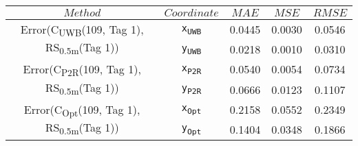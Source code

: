 \begin{table}[h]
\centering
\begin{tabular}{|c|c|c|c|c|}
\hline
$Method$ & $Coordinate$ & $MAE$ & $MSE$ & $RMSE$ \\
\hline
\multirow{2}{*}{{\footnotesize Error(C\textsubscript{UWB}(109, Tag 1), RS\textsubscript{0.5m}(Tag 1))}} & \texttt{x\textsubscript{UWB}} & 0.0445 & 0.0030 & 0.0546 \\
& \texttt{y\textsubscript{UWB}} & 0.0218 & 0.0010 & 0.0310 \\
\hline
\multirow{2}{*}{{\footnotesize Error(C\textsubscript{P2R}(109, Tag 1), RS\textsubscript{0.5m}(Tag 1))}} & \texttt{x\textsubscript{P2R}} & 0.0540 & 0.0054 & 0.0734 \\
& \texttt{y\textsubscript{P2R}} & 0.0666 & 0.0123 & 0.1107 \\
\hline
\multirow{2}{*}{{\footnotesize Error(C\textsubscript{Opt}(109, Tag 1), RS\textsubscript{0.5m}(Tag 1))}} & \texttt{x\textsubscript{Opt}} & 0.2158 & 0.0552 & 0.2349 \\
& \texttt{y\textsubscript{Opt}} & 0.1404 & 0.0348 & 0.1866 \\
\hline
\end{tabular}
\end{table}
